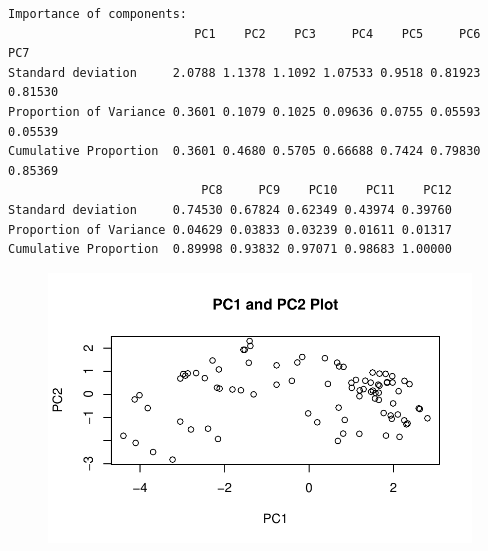 \documentclass[
  letterpaper,
  DIV=11,
  numbers=noendperiod]{scrartcl}
\newenvironment{Shaded}{\begin{snugshade}}{\end{snugshade}}
\newcommand{\AttributeTok}[1]{\textcolor[rgb]{0.40,0.45,0.13}{#1}}
\newcommand{\DecValTok}[1]{\textcolor[rgb]{0.68,0.00,0.00}{#1}}
\newcommand{\FunctionTok}[1]{\textcolor[rgb]{0.28,0.35,0.67}{#1}}
\newcommand{\NormalTok}[1]{\textcolor[rgb]{0.00,0.23,0.31}{#1}}
\newcommand{\SpecialCharTok}[1]{\textcolor[rgb]{0.37,0.37,0.37}{#1}}
\newcommand{\StringTok}[1]{\textcolor[rgb]{0.13,0.47,0.30}{#1}}
\begin{document}
\begin{verbatim}
Importance of components:
                          PC1    PC2    PC3     PC4    PC5     PC6     PC7
Standard deviation     2.0788 1.1378 1.1092 1.07533 0.9518 0.81923 0.81530
Proportion of Variance 0.3601 0.1079 0.1025 0.09636 0.0755 0.05593 0.05539
Cumulative Proportion  0.3601 0.4680 0.5705 0.66688 0.7424 0.79830 0.85369
                           PC8     PC9    PC10    PC11    PC12
Standard deviation     0.74530 0.67824 0.62349 0.43974 0.39760
Proportion of Variance 0.04629 0.03833 0.03239 0.01611 0.01317
Cumulative Proportion  0.89998 0.93832 0.97071 0.98683 1.00000
\end{verbatim}

\begin{Shaded}
\end{Shaded}

\begin{figure}[H]

{\centering \includegraphics{class10_files/figure-pdf/unnamed-chunk-29-1.pdf}

}

\end{figure}

\begin{Shaded}
\end{Shaded}
\end{document}
